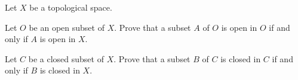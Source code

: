 \begin{comment}

\ExerciseSolution Let $a \in \R$ and let $f: \R \to (a, \infty)$ be defined by $f(x) = a+e^x$. To show that $f$ is a surjection, let $y \in (a,\infty)$. Then $y = a + z$ for some positive real number $z$. So $f(\ln(z)) = a+e^{\ln(z)} = a+z = a + (y-a) = y$. 

To verify that $f$ is an injection, suppose that $f(x_1) = f(x_2)$ for some real numbers $x_1$ and $x_2$. Then $a+e^{x_1} = a+e^{x_2}$ or $e^{x_1} = e^{x_2}$. Applying the natural log to both sides shows that $x_1 = x_2$. 

Now we need to verify that $f$ and $f^{-1}$ are continuous. Let $(r,s)$ be a basic open set in $\R$. The fact that the exponential function is increasing means that $f((r,s)) = \left(a+e^r, a+e^s\right)$, which is an open set. Thus, $f^{-1}$ is continuous. Now let $(r,s)$ be a basic open set in $(a, \infty)$. Note that $f^{-1}(x) = \ln(x-a)$. The fact that the natural log is increasing shows that $f^{-1}((r,s)) =  (\ln(r-a), \ln(s-a))$ which is an open set. Thus, $f$ is continuous. It follows that $f$ is a homeomorphism and $\R$ is homeomorphic to $(a,\infty)$. 

A similar argument shows that if $b \in \R$, then $g: \R \to (-\infty, b)$ defined by $g(x) = b-e^{x}$ is a homeomorphism. 

\end{comment}

\item Let $X$ be a topological space.
\ba

\item Let $O$ be an open subset of $X$. Prove that a subset $A$ of $O$ is open in $O$ if and only if $A$ is open in $X$. 

\item Let $C$ be a closed subset of $X$. Prove that a subset $B$ of $C$ is closed in $C$ if and only if $B$ is closed in $X$. 

\ea

\begin{comment}

\ExerciseSolution

\ba

\item Let $O$ be an open subset of $X$. Let $A$ be an open subset of $O$. Then there is an open set $U$ in $X$ such that $A = U \cap O$. As the intersection of two open subsets, we conclude that $A$ is open in $X$.

Conversely, let $A$ be a subset of $O$ that is open in $X$. Since $A$ is open in $X$, the set $A \cap O = A$ is open in $A$. 

\item Let $C$ be a closed subset of $X$. Let $B$ be a closed subset of $C$. Then there is a closed set $V$ in $X$ such that $B = V \cap C$. As the intersection of two closed subsets, we conclude that $B$ is closed in $X$.

Conversely, let $B$ be a subset of $C$ that is closed in $X$. Since $B$ is closed in $X$, the set $B \cap C = B$ is closed in $C$. 

\ea

\end{comment}


